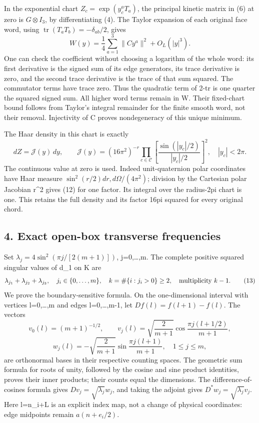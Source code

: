 \documentclass[
  11pt,
]{article}
\begin{document}
In the exponential chart \(Z_c=\exp(y_c^aT_a)\), the principal kinetic
matrix in (6) at zero is \(G\otimes I_3\), by differentiating (4). The
Taylor expansion of each original face word, using
\(\operatorname{tr}(T_aT_b)=-\delta_{ab}/2\), gives \[
 W(y)=\frac14\sum_{a=1}^3\|Cy^a\|^2+O_L(|y|^3).
\tag{11}
\] One can check the coefficient without choosing a logarithm of the
whole word: its first derivative is the signed sum of its edge
generators, its trace derivative is zero, and the second trace
derivative is the trace of that sum squared. The commutator terms have
trace zero. Thus the quadratic term of 2-tr is one quarter the squared
signed sum. All higher word terms remain in W. Their fixed-chart bound
follows from Taylor's integral remainder for the finite smooth word, not
their removal. Injectivity of C proves nondegeneracy of this unique
minimum.

The Haar density in this chart is exactly \[
 dZ=\mathcal J(y)\,dy,\qquad
 \mathcal J(y)=(16\pi^2)^{-r}
       \prod_{c\in\mathcal C}
       \left[\frac{\sin(|y_c|/2)}{|y_c|/2}\right]^2,
       \quad |y_c|<2\pi.
\tag{12}
\] The continuous value at zero is used. Indeed unit-quaternion polar
coordinates have Haar measure \(\sin^2(r/2)dr,d\Omega/(4\pi^2)\);
division by the Cartesian polar Jacobian r\^{}2 gives (12) for one
factor. Its integral over the radius-2pi chart is one. This retains the
full density and its factor 16pi squared for every original chord.

\subsection{4. Exact open-box transverse
frequencies}\label{weak-coupling-part-1-exact-open-box-transverse-frequencies}

Set \(\lambda_j=4\sin^2(\pi j/[2(m+1)])\), j=0,\ldots,m. The complete
positive squared singular values of d\_1 on K are \[
 \lambda_{j_1}+\lambda_{j_2}+\lambda_{j_3},
 \quad j_i\in\{0,\ldots,m\},\quad
 k=\#\{i:j_i>0\}\ge2,
 \quad\hbox{multiplicity }k-1.
\tag{13}
\] We prove the boundary-sensitive formula. On the one-dimensional
interval with vertices l=0,\ldots,m and edges l=0,\ldots,m-1, let
\(Df(l)=f(l+1)-f(l)\). The vectors \[
 v_0(l)=(m+1)^{-1/2},\qquad
 v_j(l)=\sqrt{\frac2{m+1}}\cos\frac{\pi j(l+1/2)}{m+1},
\] \[
 w_j(l)=-\sqrt{\frac2{m+1}}\sin\frac{\pi j(l+1)}{m+1},
       \quad 1\le j\le m,
\tag{14}
\] are orthonormal bases in their respective counting spaces. The
geometric sum formula for roots of unity, followed by the cosine and
sine product identities, proves their inner products; their counts equal
the dimensions. The difference-of-cosines formula gives
\(Dv_j=\sqrt{\lambda_j}w_j\), and taking the adjoint gives
\(D^*w_j=\sqrt{\lambda_j}v_j\). Here l=n\_i+L is an explicit index map,
not a change of physical coordinates: edge midpoints remain
\(a(n+e_i/2)\).
\end{document}

